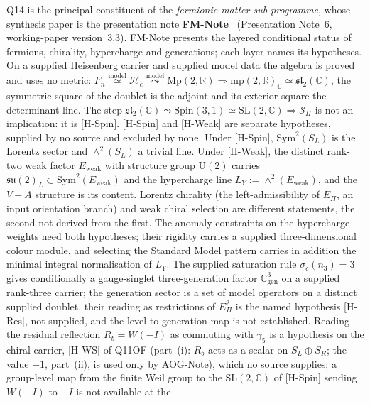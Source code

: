 \documentclass[11pt,a4paper]{article}
\providecommand{\SL}{\mathrm{SL}}
\providecommand{\Spin}{\mathrm{Spin}}
\begin{document}
    Q14 is the principal constituent of the \emph{fermionic matter sub-programme}, whose synthesis
    paper is the presentation note \textbf{FM-Note}~\cite{Beau2026fmnote} (Presentation Note~6,
    working-paper version~3.3).
    FM-Note presents the layered conditional status of fermions, chirality, hypercharge and generations; each layer
    names its hypotheses.
    On a supplied Heisenberg carrier and supplied model data the algebra is proved and uses no metric:
    $F_n \overset{\mathrm{model}}{\simeq} \mathcal{H}_c \overset{\text{model}}{\leadsto} \mathrm{Mp}(2,\mathbb{R}) \Rightarrow
    \mathrm{mp}(2,\mathbb{R})_\mathbb{C} \simeq \mathfrak{sl}_2(\mathbb{C})$, the symmetric square of the doublet is
    the adjoint and its exterior square the determinant line.
    The step $\mathfrak{sl}_2(\mathbb{C}) \leadsto \Spin(3,1) \simeq \SL(2,\mathbb{C}) \Rightarrow
    \mathcal{S}_\Pi$ is not an implication: it is [H-Spin].
    [H-Spin] and [H-Weak] are separate hypotheses, supplied by no source and excluded by none.
    Under [H-Spin], $\mathrm{Sym}^2(S_L)$ is the Lorentz sector and $\wedge^2(S_L)$ a trivial line.
    Under [H-Weak], the distinct rank-two weak factor $E_{\mathrm{weak}}$ with structure group $\mathrm{U}(2)$ carries
    $\mathfrak{su}(2)_L \subset \mathrm{Sym}^2(E_{\mathrm{weak}})$ and the hypercharge line
    $L_Y := \wedge^2(E_{\mathrm{weak}})$, and the $V{-}A$ structure is its content.
    Lorentz chirality (the left-admissibility of $E_\Pi$, an input orientation branch) and weak chiral selection are
    different statements, the second not derived from the first.
    The anomaly constraints on the hypercharge weights need both hypotheses; their rigidity carries a supplied
    three-dimensional colour module, and selecting the Standard Model pattern carries in addition the minimal
    integral normalisation of $L_Y$.
    The supplied saturation rule $\sigma_c(n_3) = 3$ gives conditionally a gauge-singlet three-generation factor
    $\mathbb{C}^3_{\mathrm{gen}}$ on a supplied rank-three carrier; the generation sector is a set of model operators
    on a distinct supplied doublet, their reading as restrictions of $E_\Pi^2$ is the named hypothesis [H-Res], not
    supplied, and the level-to-generation map is not established.
    Reading the residual reflection $R_b = W(-I)$ as commuting with $\gamma_5$ is a hypothesis on the chiral carrier,
    [H-WS] of Q11OF (part~(i): $R_b$ acts as a scalar on $S_L \oplus S_R$; the value $-1$, part~(ii), is used only by AOG-Note), which no source supplies; a group-level map
    from the finite Weil group to the $\SL(2,\mathbb{C})$ of [H-Spin] sending $W(-I)$ to $-I$ is not available at the
\end{document}
